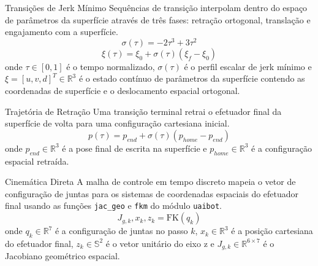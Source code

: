 \documentclass[aspectratio=169]{beamer}
\begin{document}
\begin{frame}{Transições de Jerk Mínimo}
Sequências de transição interpolam dentro do espaço de parâmetros da superfície através de três fases: retração ortogonal, translação e engajamento com a superfície.
\begin{equation}
    \sigma(\tau) = -2\tau^3 + 3\tau^2
\end{equation}
\begin{equation}
    \xi(\tau) = \xi_0 + \sigma(\tau)(\xi_f - \xi_0)
\end{equation}
onde $\tau \in [0, 1]$ é o tempo normalizado, $\sigma(\tau)$ é o perfil escalar de jerk mínimo e $\xi = [u, v, d]^T \in \mathbb{R}^3$ é o estado contínuo de parâmetros da superfície contendo as coordenadas de superfície e o deslocamento espacial ortogonal.
\end{frame}

\begin{frame}{Trajetória de Retração}
Uma transição terminal retrai o efetuador final da superfície de volta para uma configuração cartesiana inicial.
\begin{equation}
    p(\tau) = p_{end} + \sigma(\tau)(p_{home} - p_{end})
\end{equation}
onde $p_{end} \in \mathbb{R}^3$ é a pose final de escrita na superfície e $p_{home} \in \mathbb{R}^3$ é a configuração espacial retraída.
\end{frame}

\begin{frame}{Cinemática Direta}
A malha de controle em tempo discreto mapeia o vetor de configuração de juntas para os sistemas de coordenadas espaciais do efetuador final usando as funções \texttt{jac\_geo} e \texttt{fkm} do módulo \texttt{uaibot}.
\begin{equation}
    J_{g,k}, x_k, z_k = \text{FK}(q_k)
\end{equation}
onde $q_k \in \mathbb{R}^7$ é a configuração de juntas no passo $k$, $x_k \in \mathbb{R}^3$ é a posição cartesiana do efetuador final, $z_k \in \mathbb{S}^2$ é o vetor unitário do eixo z e $J_{g,k} \in \mathbb{R}^{6 \times 7}$ é o Jacobiano geométrico espacial.
\end{frame}
\end{document}
